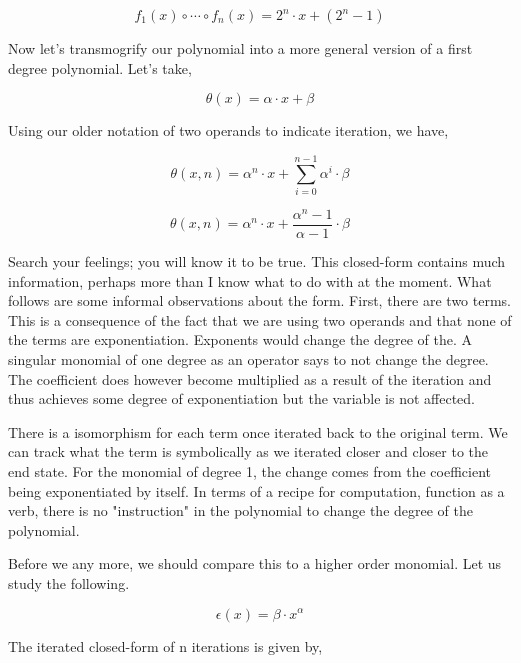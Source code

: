 \begin{equation}
    f_1(x) \circ \cdots \circ f_n(x) =  2^n \cdot x + (2^n - 1)
\end{equation}

Now let's transmogrify our polynomial into a more general version of a first
degree polynomial. Let's take,

\begin{equation}
    \theta(x) = \alpha \cdot x + \beta
\end{equation}

Using our older notation of two operands to indicate iteration, we have,

\begin{equation}
    \theta(x,n) = \alpha^n \cdot x + \sum_{i=0}^{n-1} \alpha^i \cdot \beta
\end{equation}

\begin{equation}
    \theta(x,n) = \alpha^n \cdot x + \frac{\alpha^n-1}{\alpha-1} \cdot \beta
\end{equation}

Search your feelings; you will know it to be true. This closed-form contains
much information, perhaps more than I know what to do with at the moment. What
follows are some informal observations about the form. First, there are two
terms. This is a consequence of the fact that we are using two operands and
that none of the terms are exponentiation. Exponents would change the degree of
the. A singular monomial of one degree as an operator says to not change the
degree. The coefficient does however become multiplied as a result of the
iteration and thus achieves some degree of exponentiation but the variable is
not affected.

There is a isomorphism for each term once iterated back to the original term.
We can track what the term is symbolically as we iterated closer and closer to
the end state. For the monomial of degree 1, the change comes from the
coefficient being exponentiated by itself. In terms of a recipe for
computation, function as a verb, there is no "instruction" in the polynomial to
change the degree of the polynomial.

Before we any more, we should compare this to a higher order monomial. Let us
study the following.

\begin{equation}
    \epsilon(x) = \beta \cdot x^\alpha
\end{equation}

The iterated closed-form of n iterations is given by,

